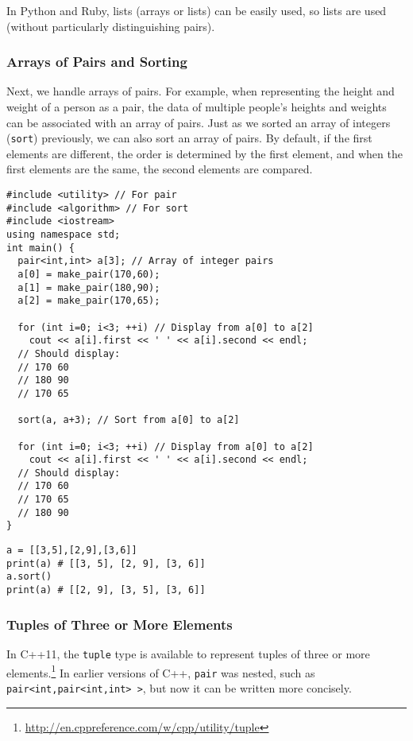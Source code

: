 In Python and Ruby, lists (arrays or lists) can be easily used, so lists are used (without particularly distinguishing pairs).

\subsubsection{Arrays of Pairs and Sorting}
Next, we handle arrays of pairs. For example, when representing the height and weight of a person as a pair, the data of multiple people's heights and weights can be associated with an array of pairs.
Just as we sorted an array of integers (\texttt{sort}) previously, we can also sort an array of pairs.
By default, if the first elements are different, the order is determined by the first element, and when the first elements are the same, the second elements are compared.

\begin{cbox}
\begin{verbatim}
#include <utility> // For pair
#include <algorithm> // For sort
#include <iostream>
using namespace std;
int main() {
  pair<int,int> a[3]; // Array of integer pairs
  a[0] = make_pair(170,60);
  a[1] = make_pair(180,90);
  a[2] = make_pair(170,65);

  for (int i=0; i<3; ++i) // Display from a[0] to a[2]
    cout << a[i].first << ' ' << a[i].second << endl;
  // Should display:
  // 170 60
  // 180 90
  // 170 65

  sort(a, a+3); // Sort from a[0] to a[2]

  for (int i=0; i<3; ++i) // Display from a[0] to a[2]
    cout << a[i].first << ' ' << a[i].second << endl;
  // Should display:
  // 170 60
  // 170 65
  // 180 90
}
\end{verbatim}
\end{cbox}

\begin{pybox}
\begin{verbatim}
a = [[3,5],[2,9],[3,6]]
print(a) # [[3, 5], [2, 9], [3, 6]]
a.sort()
print(a) # [[2, 9], [3, 5], [3, 6]]
\end{verbatim}
\end{pybox}

\subsubsection{Tuples of Three or More Elements}
In C++11, the \texttt{tuple} type is available to represent tuples of three or more elements.\footnote{\url{http://en.cppreference.com/w/cpp/utility/tuple}}
In earlier versions of C++, \texttt{pair} was nested, such as \texttt{pair<int,pair<int,int> >}, but now it can be written more concisely.

